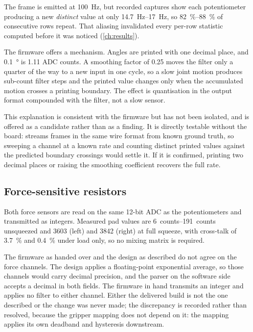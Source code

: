 The frame is emitted at \SI{100}{\hertz}, but recorded captures show each
potentiometer producing a new \emph{distinct} value at only
\SIrange{14.7}{17}{\hertz}, so \SIrange{82}{88}{\percent} of consecutive rows
repeat. That aliasing invalidated every per-row statistic computed before it
was noticed (\cref{ch:results}).

The firmware offers a mechanism. Angles are printed with one decimal place,
and \SI{0.1}{\degree} is \num{1.11} ADC counts. A smoothing factor of
\num{0.25} moves the filter only a quarter of the way to a new input in one
cycle, so a slow joint motion produces sub-count filter steps and the printed
value changes only when the accumulated motion crosses a printing boundary.
The effect is quantisation in the output format compounded with the filter,
not a slow sensor.

This explanation is consistent with the firmware but has not been isolated,
and is offered as a candidate rather than as a finding. It is directly
testable without the board:  streams frames
in the same wire format from known ground truth, so sweeping a channel at a
known rate and counting distinct printed values against the predicted
boundary crossings would settle it. If it is confirmed, printing two decimal
places or raising the smoothing coefficient recovers the full rate.

\subsection{Force-sensitive resistors}

Both force sensors are read on the same 12-bit ADC as the potentiometers and
transmitted as integers. Measured pad values are \SIrange{6}{191}{counts}
unsqueezed and \num{3603} (left) and \num{3842} (right) at full squeeze, with
cross-talk of \SI{3.7}{\percent} and \SI{0.4}{\percent} under load only, so no
mixing matrix is required.

The firmware as handed over and the design as described do not agree on the
force channels. The design applies a floating-point exponential average, so
those channels would carry decimal precision, and the parser on the software
side accepts a decimal in both fields. The firmware in hand transmits an
integer and applies no filter to either channel. Either the delivered build
is not the one described or the change was never made; the discrepancy is
recorded rather than resolved, because the gripper mapping does not depend on
it: the mapping applies its own deadband and hysteresis downstream.

